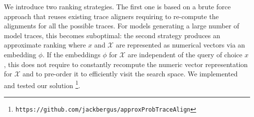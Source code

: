 We introduce two ranking strategies. The first one is based on a brute force approach that reuses existing trace aligners  \cite{LeoniM17} %
requiring to re-compute
 the alignments %
 for all the possible traces. %
 For models generating a large number of model traces, this %
 becomes suboptimal: %
 the 
 second strategy %
  produces an approximate ranking where $x$ and $\mathcal{X}$ are represented as numerical vectors via an embedding $\phi$. 
If the embeddings $\phi$ for $\mathcal{X}$ are independent of the query of choice $x$, this does not require to constantly recompute the numeric vector representation for $\mathcal{X}$ and to pre-order it to efficiently visit the search space. We implemented and tested our solution
\footnote{{\small \texttt{\tiny https://github.com/jackbergus/approxProbTraceAlign}}}. 
\medskip
%	
